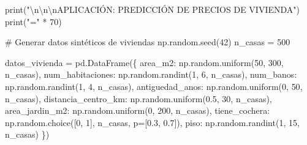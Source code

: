 \documentclass[
  doc,
  floatsintext,
  longtable,
  a4paper,
  nolmodern,
  notxfonts,
  notimes,
  12pt,
  colorlinks=true,linkcolor=blue,citecolor=blue,urlcolor=blue]{apa7}
\newenvironment{Shaded}{\begin{snugshade}}{\end{snugshade}}
\newcommand{\BuiltInTok}[1]{\textcolor[rgb]{0.00,0.23,0.31}{#1}}
\newcommand{\CharTok}[1]{\textcolor[rgb]{0.13,0.47,0.30}{#1}}
\newcommand{\CommentTok}[1]{\textcolor[rgb]{0.37,0.37,0.37}{#1}}
\newcommand{\DecValTok}[1]{\textcolor[rgb]{0.68,0.00,0.00}{#1}}
\newcommand{\FloatTok}[1]{\textcolor[rgb]{0.68,0.00,0.00}{#1}}
\newcommand{\NormalTok}[1]{\textcolor[rgb]{0.00,0.23,0.31}{#1}}
\newcommand{\OperatorTok}[1]{\textcolor[rgb]{0.37,0.37,0.37}{#1}}
\newcommand{\StringTok}[1]{\textcolor[rgb]{0.13,0.47,0.30}{#1}}
\begin{document}
\begin{Shaded}
\begin{Highlighting}[]
\BuiltInTok{print}\NormalTok{(}\StringTok{"}\CharTok{\textbackslash{}n\textbackslash{}n\textbackslash{}n}\StringTok{APLICACIÓN: PREDICCIÓN DE PRECIOS DE VIVIENDA"}\NormalTok{)}
\BuiltInTok{print}\NormalTok{(}\StringTok{"="} \OperatorTok{*} \DecValTok{70}\NormalTok{)}

\CommentTok{\# Generar datos sintéticos de viviendas}
\NormalTok{np.random.seed(}\DecValTok{42}\NormalTok{)}
\NormalTok{n\_casas }\OperatorTok{=} \DecValTok{500}

\NormalTok{datos\_vivienda }\OperatorTok{=}\NormalTok{ pd.DataFrame(\{}
    \StringTok{\textquotesingle{}area\_m2\textquotesingle{}}\NormalTok{: np.random.uniform(}\DecValTok{50}\NormalTok{, }\DecValTok{300}\NormalTok{, n\_casas),}
    \StringTok{\textquotesingle{}num\_habitaciones\textquotesingle{}}\NormalTok{: np.random.randint(}\DecValTok{1}\NormalTok{, }\DecValTok{6}\NormalTok{, n\_casas),}
    \StringTok{\textquotesingle{}num\_banos\textquotesingle{}}\NormalTok{: np.random.randint(}\DecValTok{1}\NormalTok{, }\DecValTok{4}\NormalTok{, n\_casas),}
    \StringTok{\textquotesingle{}antiguedad\_anos\textquotesingle{}}\NormalTok{: np.random.uniform(}\DecValTok{0}\NormalTok{, }\DecValTok{50}\NormalTok{, n\_casas),}
    \StringTok{\textquotesingle{}distancia\_centro\_km\textquotesingle{}}\NormalTok{: np.random.uniform(}\FloatTok{0.5}\NormalTok{, }\DecValTok{30}\NormalTok{, n\_casas),}
    \StringTok{\textquotesingle{}area\_jardin\_m2\textquotesingle{}}\NormalTok{: np.random.uniform(}\DecValTok{0}\NormalTok{, }\DecValTok{200}\NormalTok{, n\_casas),}
    \StringTok{\textquotesingle{}tiene\_cochera\textquotesingle{}}\NormalTok{: np.random.choice([}\DecValTok{0}\NormalTok{, }\DecValTok{1}\NormalTok{], n\_casas, p}\OperatorTok{=}\NormalTok{[}\FloatTok{0.3}\NormalTok{, }\FloatTok{0.7}\NormalTok{]),}
    \StringTok{\textquotesingle{}piso\textquotesingle{}}\NormalTok{: np.random.randint(}\DecValTok{1}\NormalTok{, }\DecValTok{15}\NormalTok{, n\_casas)}
\NormalTok{\})}


\end{Highlighting}
\end{Shaded}
\end{document}
